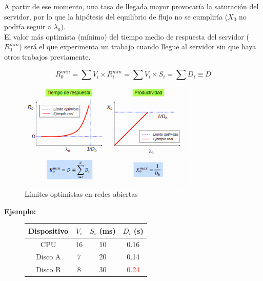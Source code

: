 \documentclass[12pt,spanish]{article}
\begin{document}
A partir de ese momento, una tasa de llegada mayor provocaría la saturación del servidor, por lo que la hipótesis del equilibrio de flujo no se cumpliría ($X_0$ no podría seguir a $\lambda_0$).\\

El valor más optimista (mínimo) del tiempo medio de respuesta del servidor ($R_0^{min}$) será el que experimenta un trabajo cuando llegue al servidor sin que haya otros trabajos previamente.

\begin{equation*}
	R_0^{min}= \sum{V_i \times R_i^{min}} = \sum{V_i \times S_i} = \sum{D_i} \equiv D
\end{equation*}

\begin{figure}[H]
	\centering
	\includegraphics[width=0.75\textwidth]{optimistasabiertas.png}
	\caption{Límites optimistas en redes abiertas}
\end{figure}

\textbf{Ejemplo:\\}

\begin{figure}[H]
	\centering
	\begin{tabular}{|c|c|c|c|}
		\hline
		Dispositivo & $V_i$ & $S_i$ (ms) & $D_i$ (s)\\
		\hline
		CPU & 16 & 10 & 0.16\\
		\hline
		Disco A & 7 & 20 & 0.14 \\
		\hline
		Disco B & 8 & 30 & \textcolor{red}{0.24} \\
		\hline
	\end{tabular}
\end{figure}
\end{document}

